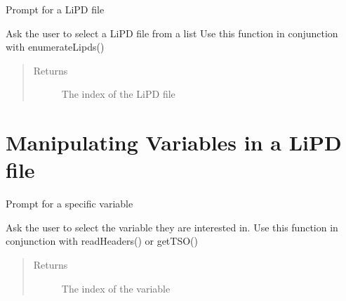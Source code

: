 \documentclass[letterpaper,10pt,english]{sphinxmanual}
\begin{document}
\begin{fulllineitems}
\label{LIPDutils:pyleoclim.promptForLipd}
Prompt for a LiPD file

Ask the user to select a LiPD file from a list
Use this function in conjunction with enumerateLipds()
\begin{quote}\begin{description}
\item[{Returns}] \leavevmode
The index of the LiPD file

\end{description}\end{quote}

\end{fulllineitems}



\section{Manipulating Variables in a LiPD file}
\label{LIPDutils:manipulating-variables-in-a-lipd-file}

\begin{fulllineitems}
\label{LIPDutils:pyleoclim.promptForVariable}
Prompt for a specific variable

Ask the user to select the variable they are interested in.
Use this function in conjunction with readHeaders() or getTSO()
\begin{quote}\begin{description}
\item[{Returns}] \leavevmode
The index of the variable

\end{description}\end{quote}

\end{fulllineitems}

\end{document}
